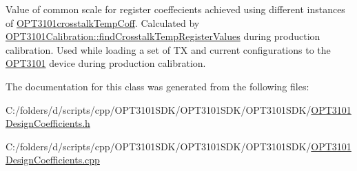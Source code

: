 Value of common scale for register coeffecients achieved using different instances of \mbox{\hyperlink{class_o_p_t3101crosstalk_temp_coff}{O\+P\+T3101crosstalk\+Temp\+Coff}}. Calculated by \mbox{\hyperlink{class_o_p_t3101_calibration_ab4a9d45a3175bec9d2d5c2967cc0348f}{O\+P\+T3101\+Calibration\+::find\+Crosstalk\+Temp\+Register\+Values}} during production calibration. Used while loading a set of TX and current configurations to the \mbox{\hyperlink{namespace_o_p_t3101}{O\+P\+T3101}} device during production calibration. 



The documentation for this class was generated from the following files\+:\begin{DoxyCompactItemize}
\item 
C\+:/folders/d/scripts/cpp/\+O\+P\+T3101\+S\+D\+K/\+O\+P\+T3101\+S\+D\+K/\+O\+P\+T3101\+S\+D\+K/\mbox{\hyperlink{_o_p_t3101_design_coefficients_8h}{O\+P\+T3101\+Design\+Coefficients.\+h}}\item 
C\+:/folders/d/scripts/cpp/\+O\+P\+T3101\+S\+D\+K/\+O\+P\+T3101\+S\+D\+K/\+O\+P\+T3101\+S\+D\+K/\mbox{\hyperlink{_o_p_t3101_design_coefficients_8cpp}{O\+P\+T3101\+Design\+Coefficients.\+cpp}}\end{DoxyCompactItemize}
